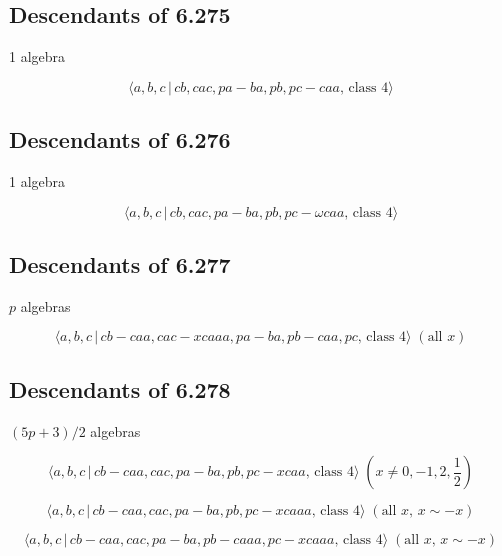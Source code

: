 \documentclass[10pt]{article}
\begin{document}
\subsection{Descendants of 6.275}

1 algebra

\begin{equation}
\langle a,b,c\,|\,cb,cac,pa-ba,pb,pc-caa,\,\text{class }4\rangle 
\tag{7.2253}
\end{equation}

\subsection{Descendants of 6.276}

1 algebra

\begin{equation}
\langle a,b,c\,|\,cb,cac,pa-ba,pb,pc-\omega caa,\,\text{class }4\rangle 
\tag{7.2254}
\end{equation}

\subsection{Descendants of 6.277}

$p$ algebras

\begin{equation}
\langle a,b,c\,|\,cb-caa,cac-xcaaa,pa-ba,pb-caa,pc,\,\text{class }4\rangle
\;(\text{all }x)  \tag{7.2255}
\end{equation}

\subsection{Descendants of 6.278}

$(5p+3)/2$ algebras

\begin{equation}
\langle a,b,c\,|\,cb-caa,cac,pa-ba,pb,pc-xcaa,\,\text{class }4\rangle
\;(x\neq 0,-1,2,\frac{1}{2})  \tag{7.2256}
\end{equation}

\begin{equation}
\langle a,b,c\,|\,cb-caa,cac,pa-ba,pb,pc-xcaaa,\,\text{class }4\rangle \;(%
\text{all }x,\,x\sim -x)  \tag{7.2257}
\end{equation}

\begin{equation}
\langle a,b,c\,|\,cb-caa,cac,pa-ba,pb-caaa,pc-xcaaa,\,\text{class }4\rangle
\;(\text{all }x,\,x\sim -x)  \tag{7.2258}
\end{equation}
\end{document}
